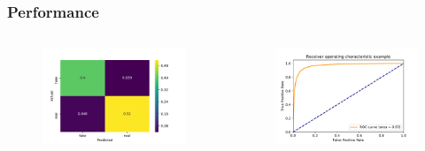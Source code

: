 \documentclass[aspectratio=1610, professionalfonts, 9pt]{beamer}
\begin{document}
  \begin{frame}
    \frametitle{Performance}
    \begin{columns}
      \begin{figure}
          \includegraphics[width=\textwidth]{pictures/bow/cnfsn_mtx_bow_best_nn.pdf}
          \caption{}
          \label{}
      \end{figure}

      \begin{figure}
          \includegraphics[width=\textwidth]{pictures/bow/roc_Hyperopt_bow_best_nn.pdf}
          \caption{}
          \label{}
      \end{figure}
    \end{columns}
  \end{frame}
\end{document}

